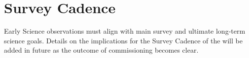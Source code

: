 \section{Survey Cadence}

Early Science observations must align with main survey and ultimate long-term science goals. 
Details on the implications for the Survey Cadence of the \esp will be added in future as the outcome of commissioning becomes clear.  

